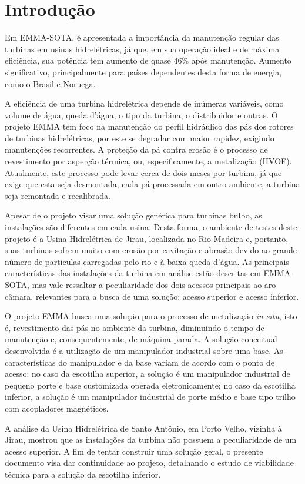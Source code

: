 \section{Introdução}\label{sec::introducao}

Em EMMA-SOTA, é apresentada a importância da manutenção regular das turbinas em
usinas hidrelétricas, já que, em sua operação ideal e de máxima eficiência, sua
potência tem aumento de quase 46\% após manutenção. Aumento significativo,
principalmente para países dependentes desta forma de energia, como o Brasil e
Noruega.

A eficiência de uma turbina hidrelétrica depende de inúmeras variáveis, como
volume de água, queda d'água, o tipo da turbina, o distribuidor e outras. O
projeto EMMA tem foco na manutenção do perfil hidráulico das pás dos rotores de
turbinas hidrelétricas, por este se degradar com maior rapidez, exigindo
manutenções recorrentes. A proteção da pá contra erosão é o processo de
revestimento por asperção térmica, ou, especificamente, a metalização (HVOF).
Atualmente, este processo pode levar cerca de dois meses por turbina, já que
exige que esta seja desmontada, cada pá processada em outro ambiente, a turbina
seja remontada e recalibrada.

Apesar de o projeto visar uma solução genérica para turbinas bulbo, as
instalações são diferentes em cada usina. Desta forma, o ambiente de testes
deste projeto é a Usina Hidrelétrica de Jirau, localizada no Rio Madeira e, portanto,
suas turbinas sofrem muito com erosão por cavitação e abrasão devido ao grande
número de partículas carregadas pelo rio e à baixa queda d'água. As principais
características das instalações da turbina em análise estão descritas em
EMMA-SOTA, mas vale ressaltar a peculiaridade dos dois acessos principais ao aro
câmara, relevantes para a busca de uma solução: acesso superior e acesso inferior.

O projeto EMMA busca uma solução para o processo de metalização \textit{in
situ}, isto é, revestimento das pás no ambiente da turbina, diminuindo o tempo
de manutenção e, consequentemente, de máquina parada.  A solução conceitual
desenvolvida é a utilização de um manipulador industrial sobre uma base. As
características do manipulador e da base variam de acordo com o ponto de acesso: no caso da escotilha superior, a solução é um
manipulador industrial de pequeno porte e base customizada operada
eletronicamente; no caso da escotilha inferior, a solução é um manipulador
industrial de porte médio e base tipo trilho com acopladores magnéticos.

A análise da Usina Hidrelétrica de Santo Antônio, em Porto Velho, vizinha à
Jirau, mostrou que as instalações da turbina não possuem a peculiaridade de um acesso
superior. A fim de tentar construir uma solução geral, o presente documento
visa dar continuidade ao projeto, detalhando o estudo de viabilidade técnica
para a solução da escotilha inferior.

